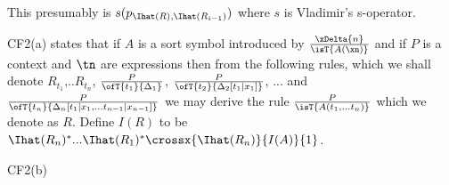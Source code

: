 \begin{tightquote}
\begin{oldtt}
\begin{point}
This presumably is $s(p_{\Ihat(R),\Ihat(R_{i-1})})$ where $s$ is Vladimir's s-operator.
\end{point}
\begin{point}
CF2(a) states that if $A$ is a sort symbol introduced by
$\frac{\xDelta{n}}{\isT{A(\xn)}}$ 
and if $P$ is a context and $\tn$ are expressions then from the following rules, which we shall denote $R_{t_1}$,..$R_{t_n}$,
$\frac{P}{\ofT{t_1}{\Delta_1}}$,
$\frac{P}{\ofT{t_2}{\Delta_2[t_1|x_1]}}$,
... and 
$\frac{P}{\ofT{t_n}{\Delta_n[t_1|x_1,...t_{n-1}|x_{n-1}]}}$
we may derive the rule
$\frac{P}{\isT{A(t_1,...t_n)}}$ which we denote as $R$. 
Define $I(R)$ to be $\Ihat(R_n)^*...\Ihat(R_1)^*\crossx{\Ihat(R_n)}{I(A)}{1}$.
\end{point}
\begin{point}
CF2(b) 
\end{point}
\end{oldtt}


\end{tightquote}

